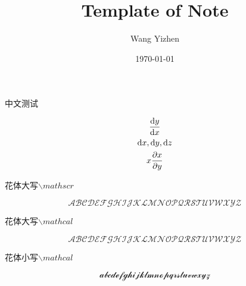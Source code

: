 \documentclass[a4paper,12pt]{article}
\title{Template of Note}
\author{Wang Yizhen}
\date{\today}
\begin{document}
\maketitle
\thispagestyle{empty}
\newpage
\thispagestyle{empty}

中文测试

\begin{gather*}
    \frac{\mathop{}\!\mathrm{d} y}{\mathop{}\!\mathrm{d} x}\\
    \mathop{}\!\mathrm{d}x, \mathop{}\!\mathrm{d}y, \mathop{}\!\mathrm{d}z\\
    x\frac{\mathop{}\!\partial x}{\mathop{}\!\partial y}
\end{gather*}

花体大写$\backslash mathscr$

\begin{equation*}
    \mathscr{ABCDEFGHIJKLMNOPQRSTUVWXYZ}
\end{equation*}

花体大写$\backslash mathcal$

\begin{equation*}
    \mathcal{ABCDEFGHIJKLMNOPQRSTUVWXYZ}
\end{equation*}

花体小写$\backslash mathcal$

\begin{equation*}
    \mathcal{abcdefghijklmnopqrstuvwxyz}
\end{equation*}
\tableofcontents
\thispagestyle{empty}
\newpage

\setcounter{page}{1}


\end{document}

